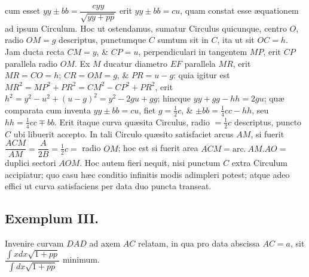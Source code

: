 cum esset $yy\pm bb=\dfrac{cyy}{\sqrt{yy+pp}}$ erit $yy\pm bb=cu$, quam constat esse æquationem ad ipsum Circulum. Hoc ut ostendamus, sumatur Circulus quicunque, centro $O$, radio $OM=g$ descriptus, punctumque $C$ sumtum sit in $C$, ita ut sit $OC=h$. Jam ducta recta $CM=y$, \& $CP=u$, perpendiculari in tangentem $MP$, erit $CP$ parallela radio $OM$. Ex $M$ ducatur diametro $EF$ parallela $MR$, erit $MR=CO=h$; $CR=OM=g$, \& $PR=u-g$: quia igitur est $MR^2=MP^2+PR^2=CM^2-CP^2+PR^2$, erit $h^2=y^2-u^2+(u-g)^2=y^2-2gu+gg$; hincque $yy+gg-hh=2gu$; quæ comparata cum inventa $yy\pm bb=cu$, fiet $g=\tfrac12c$, \& $\pm bb=\tfrac14cc-hh$, seu $hh=\tfrac14cc\mp bb$. Erit itaque curva quæsita Circulus, radio $=\tfrac12c$ descriptus, puncto $C$ ubi libuerit accepto. In tali Circulo quæsito satisfaciet arcus $AM$, si fuerit $\dfrac{ACM}{AM}=\dfrac{A}{2B}=\tfrac12c=$ radio $OM$; hoc est si fuerit area $ACM=\mathrm{arc.}\ AM.AO=$ duplici sectori $AOM$. Hoc autem fieri nequit, nisi punctum $C$ extra Circulum accipiatur; quo casu hæc conditio infinitis modis adimpleri potest; atque adeo effici ut curva satisfaciens per data duo puncta transeat.
\subsection*{Exemplum III.}
Invenire curvam $DAD$ ad axem $AC$ relatam, in qua pro data abscissa $AC=a$, sit $\dfrac{\int xdx\sqrt{1+pp}}{\int dx\sqrt{1+pp}}$ minimum.

